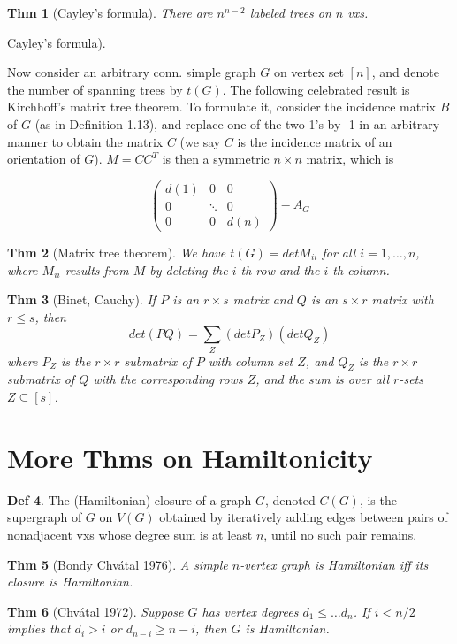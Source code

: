 \documentclass[11pt, fleqn, a4paper, landscape]{article}
\theoremstyle{plain} %
\newtheorem{thm}{Thm}
\theoremstyle{remark} %
\theoremstyle{definition} %
\newtheorem{defi}[thm]{Def}
\begin{document}
\begin{multicols}{5}
\begin{thm}[Cayley's formula]
There are $n^{n-2}$ labeled trees on $n$ vxs.
\end{thm}Cayley’s formula). 

Now consider an arbitrary conn. simple graph $G$ on vertex set $[n]$, and denote the number of spanning trees by $t(G)$. The following celebrated result is Kirchhoff’s matrix tree theorem. To formulate it, consider the incidence matrix $B$ of $G$ (as in Definition 1.13), and replace one of the
two 1’s by -1 in an arbitrary manner to obtain the matrix $C$ (we say $C$ is the incidence matrix of an orientation of $G$). $ M = CC^T$ is then a symmetric $n \times n$ matrix, which is 

\[
\begin{pmatrix}
d(1) & 0 & 0  \\
0 & \ddots & 0  \\
0 & 0 & d(n)  
\end{pmatrix}-A_G\]

\begin{thm}[Matrix tree theorem]
We have $t(G) = det M_{ii}$ for all $i = 1, \dots , n$, where $M_{ii}$ results
from $M$ by deleting the $i$-th row and the $i$-th column.
\end{thm}

\begin{thm}[Binet,  Cauchy]
If $P$ is an $r \times s$ matrix and $Q$ is an $s \times r$ matrix with $r\le s$, then \[det(PQ) =\sum_Z (det P_Z)(detQ_Z)\]
where $P_Z$ is the $r\times r$ submatrix of $P$ with column set $Z$, and $Q_Z$ is the $r\times r$ submatrix of $Q$ with the corresponding rows $Z$, and the sum is over all $r$-sets $Z \subseteq [s]$.
\end{thm}

\addtocounter{subsection}{1}

\section{More Thms on Hamiltonicity}
\begin{defi}
The (Hamiltonian) closure of a graph $G$, denoted $C(G)$, is the supergraph of $G$ on $V (G)$ obtained by iteratively adding edges between pairs of nonadjacent vxs whose degree sum is at least $n$, until no such pair remains.
\end{defi}
\begin{thm}[Bondy Chvátal 1976]
A simple $n$-vertex graph is Hamiltonian iff its closure is Hamiltonian.
\end{thm}
\begin{thm}[Chvátal 1972]
Suppose $G$ has vertex degrees $d_1\le \dots d_n$. If $i < n/2$ implies
that $d_i > i$ or $d_{n-i} \ge n - i$, then $G$ is Hamiltonian.
\end{thm}


\end{multicols}
\end{document}
